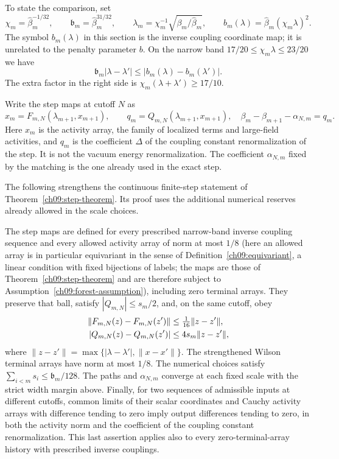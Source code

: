 To state the comparison, set
\[
 \chi_m=\widehat\beta_m^{-1/32},\qquad
 \mathfrak b_m=\widehat\beta_m^{31/32},\qquad
 \lambda_m=\chi_m^{-1}\sqrt{\beta_m/\widehat\beta_m},\qquad
 b_m(\lambda)=\widehat\beta_m(\chi_m\lambda)^2.
\]
The symbol $b_m(\lambda)$ in this section is the inverse coupling coordinate
map; it is unrelated to the penalty parameter $b$. On the narrow band
$17/20\le\chi_m\lambda\le23/20$ we have
\begin{equation}\label{ch10:inverse-coordinate}
 \mathfrak b_m|\lambda-\lambda'|\le
               |b_m(\lambda)-b_m(\lambda')|.
\end{equation}
The extra factor in the right side is
$\chi_m(\lambda+\lambda')\ge17/10$.

Write the step maps at cutoff $N$ as
\[
 x_m=F_{m,N}(\lambda_{m+1},x_{m+1}),\qquad
 q_m=Q_{m,N}(\lambda_{m+1},x_{m+1}),
 \quad
 \beta_m-\beta_{m+1}-\alpha_{N,m}=q_m.
\]
Here $x_m$ is the activity array, the family of localized terms and large-field activities, and $q_m$ is the coefficient $\Delta$ of the coupling constant
renormalization of the step. It is not the vacuum energy renormalization. The coefficient
$\alpha_{N,m}$ fixed by the matching is the one already used in the exact step.

The following strengthens the continuous finite-step statement of
Theorem~\ref{ch09:step-theorem}. Its proof uses the additional numerical reserves already allowed
in the scale choices.
\begin{proposition}
\label{ch10:stability-assumption}
The step maps are defined for every prescribed narrow-band inverse coupling
sequence and every allowed activity array of norm at most $1/8$ (here an allowed array is in particular equivariant in the sense of Definition~\ref{ch09:equivariant}, a linear condition with fixed bijections of labels; the maps are those of Theorem~\ref{ch09:step-theorem} and are therefore subject to Assumption~\ref{ch09:forest-assumption}),
including zero terminal arrays. They preserve that ball, satisfy
$|Q_{m,N}|\le s_m/2$, and, on the same cutoff, obey
\begin{align}\label{ch10:lipschitz}
 \|F_{m,N}(z)-F_{m,N}(z')\|&\le\tfrac1{16}\|z-z'\|,\\
 |Q_{m,N}(z)-Q_{m,N}(z')|&\le4s_m\|z-z'\|,\notag
\end{align}
where $\|z-z'\|=\max\{|\lambda-\lambda'|,\|x-x'\|\}$.
The strengthened Wilson terminal arrays have norm at most $1/8$.
The numerical choices satisfy $\sum_{i<m}s_i\le \mathfrak b_m/128$.
The paths and $\alpha_{N,m}$ converge at each fixed scale with the
strict width margin above. Finally, for two sequences of admissible
inputs at different cutoffs, common limits of their scalar coordinates
and Cauchy activity arrays with difference tending to zero imply
output differences tending to zero, in both the activity norm and
the coefficient of the coupling constant renormalization. This last assertion applies also to every
zero-terminal-array history with prescribed inverse couplings.
\end{proposition}

